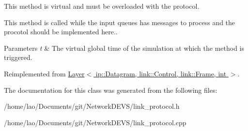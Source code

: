 This method is virtual and must be overloaded with the protocol. 

This method is called while the input queues has messages to process and the procotol should be implemented here..


\begin{DoxyParams}{Parameters}
{\em t} & The virtual global time of the simulation at which the method is triggered. \\
\hline
\end{DoxyParams}


Reimplemented from \hyperlink{classLayer_a1c82b14ba3efc37969f55c633a9b3173}{Layer$<$ ip\+::\+Datagram, link\+::\+Control, link\+::\+Frame, int $>$}.



The documentation for this class was generated from the following files\+:\begin{DoxyCompactItemize}
\item 
/home/lao/\+Documents/git/\+Network\+D\+E\+V\+S/link\+\_\+protocol.\+h\item 
/home/lao/\+Documents/git/\+Network\+D\+E\+V\+S/link\+\_\+protocol.\+cpp\end{DoxyCompactItemize}
